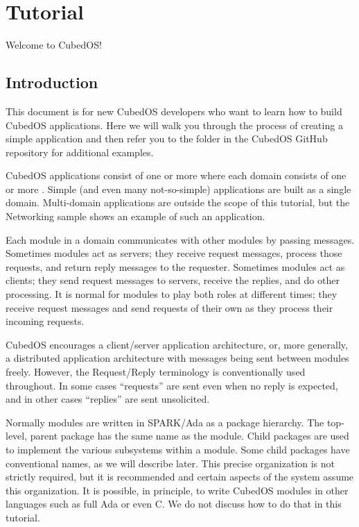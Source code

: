 
\section{Tutorial}
\label{sec:manual-tutorial}

Welcome to CubedOS!

\subsection{Introduction}
\label{sec:manual-tutorial-introduction}

This document is for new CubedOS developers who want to learn how to build CubedOS applications.
Here we will walk you through the process of creating a simple application and then refer you to
the  folder in the CubedOS GitHub repository for additional examples.

CubedOS applications consist of one or more  where each domain consists of one
or more . Simple (and even many not-so-simple) applications are built as a
single domain. Multi-domain applications are outside the scope of this tutorial, but the
Networking sample shows an example of such an application.

Each module in a domain communicates with other modules by passing messages. Sometimes modules
act as servers; they receive request messages, process those requests, and return reply messages
to the requester. Sometimes modules act as clients; they send request messages to servers,
receive the replies, and do other processing. It is normal for modules to play both roles at
different times; they receive request messages and send requests of their own as they process
their incoming requests.

CubedOS encourages a client/server application architecture, or, more generally, a distributed
application architecture with messages being sent between modules freely. However, the
Request/Reply terminology is conventionally used throughout. In some cases ``requests'' are sent
even when no reply is expected, and in other cases ``replies'' are sent unsolicited.

Normally modules are written in SPARK/Ada as a package hierarchy. The top-level, parent package
has the same name as the module. Child packages are used to implement the various subsystems
within a module. Some child packages have conventional names, as we will describe later. This
precise organization is not strictly required, but it is recommended and certain aspects of the
system assume this organization. It is possible, in principle, to write CubedOS modules in other
languages such as full Ada or even C. We do not discuss how to do that in this tutorial.

